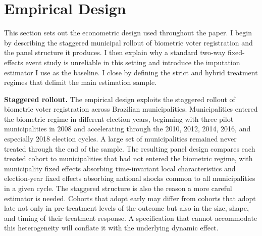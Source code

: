 \section{Empirical Design}
\label{sec:empirical-design}

This section sets out the econometric design used throughout the paper. I begin by describing the staggered municipal rollout of biometric voter registration and the panel structure it produces. I then explain why a standard two-way fixed-effects event study is unreliable in this setting and introduce the imputation estimator I use as the baseline. I close by defining the strict and hybrid treatment regimes that delimit the main estimation sample.

\textbf{Staggered rollout.} The empirical design exploits the staggered rollout of biometric voter registration across Brazilian municipalities. Municipalities entered the biometric regime in different election years, beginning with three pilot municipalities in 2008 and accelerating through the 2010, 2012, 2014, 2016, and especially 2018 election cycles. A large set of municipalities remained never treated through the end of the sample. The resulting panel design compares each treated cohort to municipalities that had not entered the biometric regime, with municipality fixed effects absorbing time-invariant local characteristics and election-year fixed effects absorbing national shocks common to all municipalities in a given cycle. The staggered structure is also the reason a more careful estimator is needed. Cohorts that adopt early may differ from cohorts that adopt late not only in pre-treatment levels of the outcome but also in the size, shape, and timing of their treatment response. A specification that cannot accommodate this heterogeneity will conflate it with the underlying dynamic effect.


